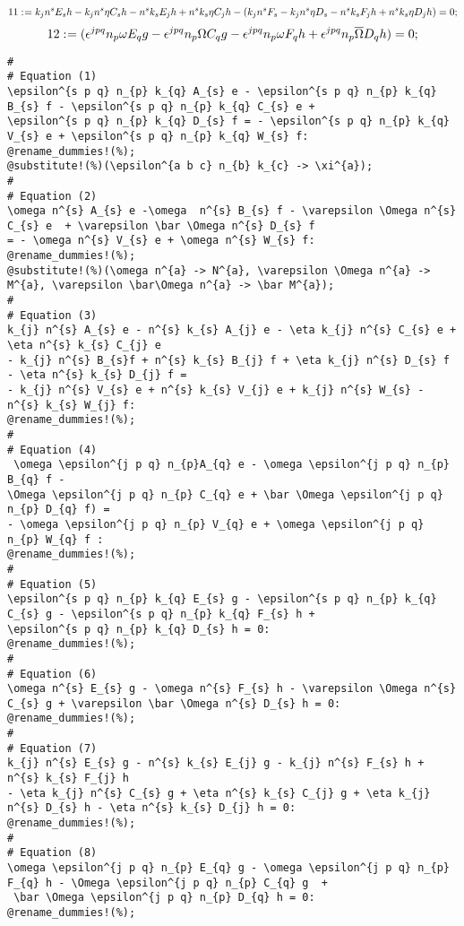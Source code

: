\documentclass[11pt]{article}
\def\specialcolon{\mathrel{\mathop{:}}\hspace{-.5em}}
\renewcommand{\bar}[1]{\overline{#1}}
\begin{document}
\begin{dmath*}[compact, spread=2pt]
11\specialcolon{}= {k}_{j} {n}^{s} {E}_{s} h - {k}_{j} {n}^{s} \eta {C}_{s} h - {n}^{s} {k}_{s} {E}_{j} h + {n}^{s} {k}_{s} \eta {C}_{j} h - ({k}_{j} {n}^{s} {F}_{s} - {k}_{j} {n}^{s} \eta {D}_{s} - {n}^{s} {k}_{s} {F}_{j} h + {n}^{s} {k}_{s} \eta {D}_{j} h) = 0;
\end{dmath*}
\begin{dmath*}[compact, spread=2pt]
12\specialcolon{}= ({\epsilon}^{j p q} {n}_{p} \omega {E}_{q} g - {\epsilon}^{j p q} {n}_{p} \Omega {C}_{q} g - {\epsilon}^{j p q} {n}_{p} \omega {F}_{q} h + {\epsilon}^{j p q} {n}_{p} \bar \Omega {D}_{q} h) = 0;
\end{dmath*}
{\color[named]{Blue}\begin{verbatim}
#
# Equation (1)
\epsilon^{s p q} n_{p} k_{q} A_{s} e - \epsilon^{s p q} n_{p} k_{q} B_{s} f - \epsilon^{s p q} n_{p} k_{q} C_{s} e +
\epsilon^{s p q} n_{p} k_{q} D_{s} f = - \epsilon^{s p q} n_{p} k_{q} V_{s} e + \epsilon^{s p q} n_{p} k_{q} W_{s} f:
@rename_dummies!(%);
@substitute!(%)(\epsilon^{a b c} n_{b} k_{c} -> \xi^{a});
#
# Equation (2)
\omega n^{s} A_{s} e -\omega  n^{s} B_{s} f - \varepsilon \Omega n^{s} C_{s} e  + \varepsilon \bar \Omega n^{s} D_{s} f
= - \omega n^{s} V_{s} e + \omega n^{s} W_{s} f:
@rename_dummies!(%);
@substitute!(%)(\omega n^{a} -> N^{a}, \varepsilon \Omega n^{a} -> M^{a}, \varepsilon \bar\Omega n^{a} -> \bar M^{a});
#
# Equation (3)
k_{j} n^{s} A_{s} e - n^{s} k_{s} A_{j} e - \eta k_{j} n^{s} C_{s} e + \eta n^{s} k_{s} C_{j} e
- k_{j} n^{s} B_{s}f + n^{s} k_{s} B_{j} f + \eta k_{j} n^{s} D_{s} f - \eta n^{s} k_{s} D_{j} f =
- k_{j} n^{s} V_{s} e + n^{s} k_{s} V_{j} e + k_{j} n^{s} W_{s} - n^{s} k_{s} W_{j} f:
@rename_dummies!(%);
#
# Equation (4)
 \omega \epsilon^{j p q} n_{p}A_{q} e - \omega \epsilon^{j p q} n_{p} B_{q} f -
\Omega \epsilon^{j p q} n_{p} C_{q} e + \bar \Omega \epsilon^{j p q} n_{p} D_{q} f) =
- \omega \epsilon^{j p q} n_{p} V_{q} e + \omega \epsilon^{j p q} n_{p} W_{q} f :
@rename_dummies!(%);
#
# Equation (5)
\epsilon^{s p q} n_{p} k_{q} E_{s} g - \epsilon^{s p q} n_{p} k_{q} C_{s} g - \epsilon^{s p q} n_{p} k_{q} F_{s} h +
\epsilon^{s p q} n_{p} k_{q} D_{s} h = 0:
@rename_dummies!(%);
#
# Equation (6)
\omega n^{s} E_{s} g - \omega n^{s} F_{s} h - \varepsilon \Omega n^{s} C_{s} g + \varepsilon \bar \Omega n^{s} D_{s} h = 0:
@rename_dummies!(%);
#
# Equation (7)
k_{j} n^{s} E_{s} g - n^{s} k_{s} E_{j} g - k_{j} n^{s} F_{s} h + n^{s} k_{s} F_{j} h
- \eta k_{j} n^{s} C_{s} g + \eta n^{s} k_{s} C_{j} g + \eta k_{j} n^{s} D_{s} h - \eta n^{s} k_{s} D_{j} h = 0:
@rename_dummies!(%);
#
# Equation (8)
\omega \epsilon^{j p q} n_{p} E_{q} g - \omega \epsilon^{j p q} n_{p} F_{q} h - \Omega \epsilon^{j p q} n_{p} C_{q} g  +
 \bar \Omega \epsilon^{j p q} n_{p} D_{q} h = 0:
@rename_dummies!(%);
\end{verbatim}}
\end{document}
